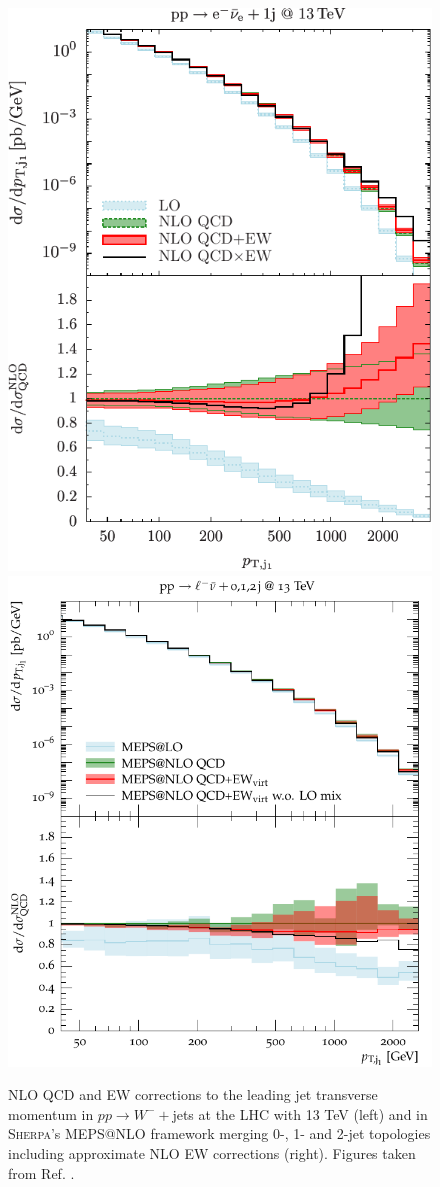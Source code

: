 \documentclass[a4paper,11pt,notoc]{article}
\newcommand{\SHERPA}{\textsc{Sherpa}}
\begin{document}
\begin{figure}[t!]
\centering
\includegraphics[width=0.425\columnwidth]{ppenexj_incl_pT_j1_gp.pdf} 
\includegraphics[width=0.495\columnwidth]{meps_pT_j1_log.pdf} 
\caption{NLO QCD and EW corrections to the leading jet transverse momentum in  $p p \to W^- +$jets at the LHC with 13 TeV (left) and in \SHERPA's MEPS@NLO framework merging 0-, 1- and 2-jet topologies including approximate NLO EW corrections (right). Figures taken from Ref. \cite{Kallweit:2015dum}.}
\label{fig:NLOEW_pTj}
\end{figure}   

%
\end{document}
